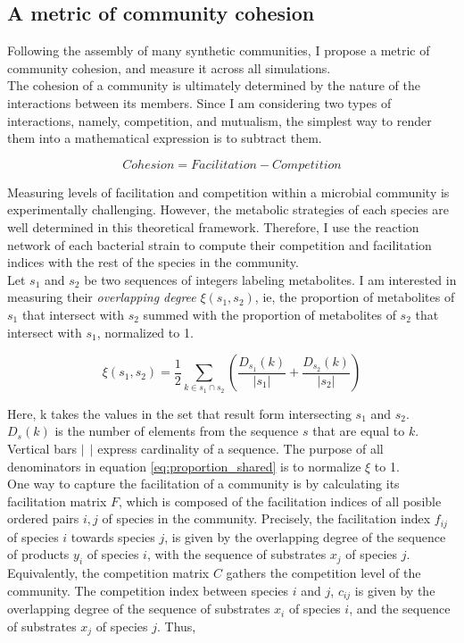 \documentclass[titlepage,11pt]{article}
\begin{document}
\begin{linenumbers}
\begin{singlespace}
				\subsection{A metric of community cohesion}
					Following the assembly of many synthetic communities, I propose a metric of community cohesion, and measure it across all simulations. \\
					The cohesion of a community is ultimately determined by the nature of the interactions between its members. Since I am considering two types of interactions, namely, competition, and mutualism, the simplest way to render them into a mathematical expression is to subtract them.
					\begin{linenomath*}
						\begin{equation}\label{eq:cohesion_idea}
							Cohesion = Facilitation - Competition
						\end{equation}
					\end{linenomath*}
					Measuring levels of facilitation and competition within a microbial community is experimentally challenging. However, the metabolic strategies of each species are well determined in this theoretical framework. Therefore, I use the reaction network of each bacterial strain to compute their competition and facilitation indices with the rest of the species in the community.\\ 
					Let $ s_1 $ and $ s_2 $ be two sequences of integers labeling metabolites. I am interested in measuring  their \textit{overlapping degree} $ \xi(s_1, s_2) $, ie, the proportion of metabolites of $ s_1 $ that intersect with $ s_2 $ summed with the proportion of metabolites of $ s_2 $ that intersect with $ s_1 $, normalized to 1.
					\begin{linenomath*}	
						\begin{equation}\label{eq:proportion_shared}
							\xi (s_1, s_2) = \frac {1}{2} \sum_{k \in s_1 \cap s_2} \left(\frac{D_{s_1}(k)}{|s_1|} + \frac{D_{s_2}(k)}{|s_2|}\right)
						\end{equation}
					\end{linenomath*}	
					Here, k takes the values in the set that result form intersecting $ s_1 $ and $ s_2 $. $ D_s(k) $ is the number of elements from the sequence $ s $ that are equal to $ k $. Vertical bars $  | \ \ | $ express cardinality of a sequence. The purpose of all denominators in equation \ref{eq:proportion_shared} is to normalize $ \xi $ to 1.\\
					One way to capture the facilitation of a community is by calculating its facilitation matrix $ F $, which is composed of the facilitation indices of all posible ordered pairs $ i, j $ of species in the community. Precisely, the facilitation index $ f_{ij} $ of species $ i $ towards species $ j $, is given by the overlapping degree of the sequence of products $ y_i $ of species $ i $,  with the sequence of substrates $ x_j $ of species $ j $. Equivalently, the competition matrix $ C $ gathers the competition level of the community. The competition index between species $ i $ and $ j $,  $ c_{ij} $  is given by the overlapping degree of the sequence of substrates $ x_i $ of species $ i $,  and the sequence of substrates $ x_j $ of species $ j $. Thus, 

\end{singlespace}
\end{linenumbers}
\end{document}
